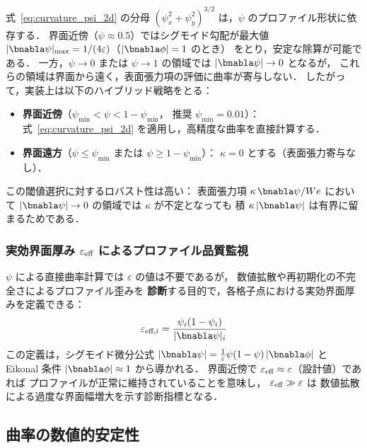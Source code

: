式~\eqref{eq:curvature_psi_2d} の分母
$(\psi_x^2+\psi_y^2)^{3/2}$ は，$\psi$ のプロファイル形状に依存する．
界面近傍（$\psi \approx 0.5$）ではシグモイド勾配が最大値
$|\bnabla\psi|_{\max} = 1/(4\varepsilon)$（$|\bnabla\phi|=1$ のとき）
をとり，安定な除算が可能である．
一方，$\psi \to 0$ または $\psi \to 1$ の領域では
$|\bnabla\psi| \to 0$ となるが，
これらの領域は界面から遠く，表面張力項の評価に曲率が寄与しない．
したがって，実装上は以下のハイブリッド戦略をとる：
\begin{itemize}
  \item \textbf{界面近傍}（$\psi_{\min} < \psi < 1-\psi_{\min}$，
        推奨 $\psi_{\min}=0.01$）：
        式~\eqref{eq:curvature_psi_2d} を適用し，高精度な曲率を直接計算する．
  \item \textbf{界面遠方}（$\psi \le \psi_{\min}$ または
        $\psi \ge 1-\psi_{\min}$）：
        $\kappa = 0$ とする（表面張力寄与なし）．
\end{itemize}
この閾値選択に対するロバスト性は高い：
表面張力項 $\kappa\,\bnabla\psi/We$ において
$|\bnabla\psi| \to 0$ の領域では $\kappa$ が不定となっても
積 $\kappa\,|\bnabla\psi|$ は有界に留まるためである．

\subsubsection{実効界面厚み \texorpdfstring{$\varepsilon_{\textup{eff}}$}{ε\_eff} によるプロファイル品質監視}

$\psi$ による直接曲率計算では $\varepsilon$ の値は不要であるが，
数値拡散や再初期化の不完全さによるプロファイル歪みを
\textbf{診断}する目的で，各格子点における実効界面厚みを定義できる：
\begin{equation}
  \varepsilon_{\textup{eff},i}
  = \frac{\psi_i(1-\psi_i)}{|\bnabla\psi|_i}
  \label{eq:epsilon_eff}
\end{equation}
この定義は，シグモイド微分公式
$|\bnabla\psi| = \frac{1}{\varepsilon}\psi(1-\psi)\,|\bnabla\phi|$
と Eikonal 条件 $|\bnabla\phi| \approx 1$ から導かれる．
界面近傍で $\varepsilon_{\textup{eff}} \approx \varepsilon$（設計値）であれば
プロファイルが正常に維持されていることを意味し，
$\varepsilon_{\textup{eff}} \gg \varepsilon$ は
数値拡散による過度な界面幅増大を示す診断指標となる．

\subsection{曲率の数値的安定性}
\label{sec:curvature_stab}

